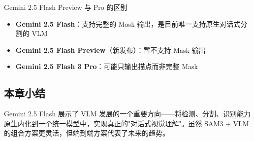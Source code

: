 \begin{knowledgebox}{Gemini 2.5 Flash Preview 与 Pro 的区别}
\begin{itemize}
    \item \textbf{Gemini 2.5 Flash}：支持完整的 Mask 输出，是目前唯一支持原生对话式分割的 VLM
    \item \textbf{Gemini 2.5 Flash Preview}（新发布）：暂不支持 Mask 输出
    \item \textbf{Gemini 2.5 Flash 3 Pro}：可能只输出描点而非完整 Mask
\end{itemize}
\end{knowledgebox}

\subsection{本章小结}

Gemini 2.5 Flash 展示了 VLM 发展的一个重要方向——将检测、分割、识别能力原生内化到一个统一模型中，实现真正的"对话式视觉理解"。虽然 SAM3 + VLM 的组合方案更灵活，但端到端方案代表了未来的趋势。


